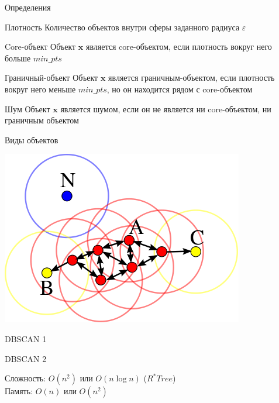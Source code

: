 \documentclass[aspectratio=169]{beamer}
\begin{document}
\begin{frame}{Определения}

\begin{block}{Плотность}
Количество объектов внутри сферы заданного радиуса $\varepsilon$
\end{block}

\begin{block}{Core-объект}
Объект $\mathbf{x}$ является core-объектом, если плотность вокруг него больше $min\_pts$
\end{block}

\begin{block}{Граничный-объект}
Объект $\mathbf{x}$ является граничным-объектом, если плотность вокруг него меньше $min\_pts$, но он находится рядом с core-объектом
\end{block}

\begin{block}{Шум}
Объект $\mathbf{x}$ является шумом, если он не является ни core-объектом, ни граничным объектом
\end{block}

\end{frame}

\begin{frame}{Виды объектов}

\begin{center}
\includegraphics[scale=0.5]{images/points.png}
\end{center}

\end{frame}

\begin{frame}{DBSCAN 1}

\dbscan

\end{frame}

\begin{frame}{DBSCAN 2}

\extc

Сложность: $O(n^2)$ или $O(n \log n)$ ($R^*Tree$) \\ 
Память: $O(n)$ или $O(n^2)$ 

\end{frame}
\end{document}
